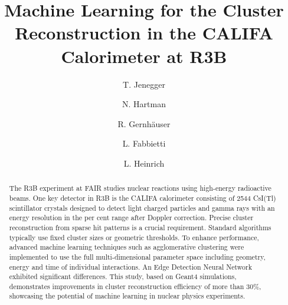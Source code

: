 \documentclass[final,5p,times,twocolumn]{elsarticle}
\begin{document}
\begin{frontmatter}



\title{Machine Learning for the Cluster Reconstruction in the CALIFA Calorimeter at R3B}

\author[1]{T. Jenegger}
\author[1]{N. Hartman}
\author[1]{R. Gernh\"auser}
\author[1]{L. Fabbietti}
\author[1]{L. Heinrich}
\address[1]{{TUM School of Natural Sciences, Technical University of Munich},%
            {Germany}}

\begin{abstract}

The R3B experiment at FAIR studies nuclear reactions using high-energy radioactive beams. One key detector in R3B is the CALIFA calorimeter consisting of 2544 CsI(Tl) scintillator crystals designed to detect light charged particles and  gamma rays with an energy resolution in the per cent range after Doppler correction. Precise cluster reconstruction from sparse hit patterns is a crucial requirement. Standard algorithms typically use fixed cluster sizes or geometric thresholds. To enhance performance, advanced machine learning techniques such as agglomerative clustering were implemented to use the full multi-dimensional parameter space including geometry, energy and time of individual interactions. An Edge Detection Neural Network exhibited significant differences. This study, based on Geant4 simulations, demonstrates improvements in cluster reconstruction efficiency of more than 30\%, showcasing the potential of machine learning in nuclear physics experiments.
\end{abstract}


\end{frontmatter}
\end{document}
